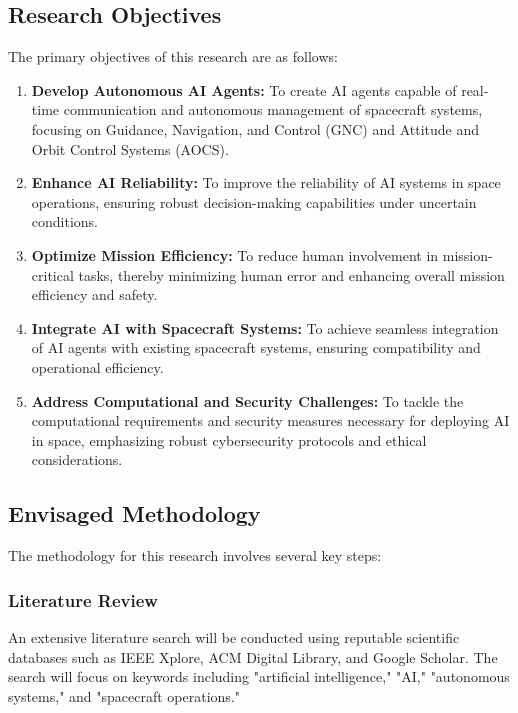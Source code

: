 \documentclass[a4paper,12pt]{article}
\begin{document}
\subsection{Research Objectives}

The primary objectives of this research are as follows:

\begin{enumerate}
    \item \textbf{Develop Autonomous AI Agents:} To create AI agents capable of real-time communication and autonomous management of spacecraft systems, focusing on Guidance, Navigation, and Control (GNC) and Attitude and Orbit Control Systems (AOCS).
    \item \textbf{Enhance AI Reliability:} To improve the reliability of AI systems in space operations, ensuring robust decision-making capabilities under uncertain conditions.
    \item \textbf{Optimize Mission Efficiency:} To reduce human involvement in mission-critical tasks, thereby minimizing human error and enhancing overall mission efficiency and safety.
    \item \textbf{Integrate AI with Spacecraft Systems:} To achieve seamless integration of AI agents with existing spacecraft systems, ensuring compatibility and operational efficiency.
    \item \textbf{Address Computational and Security Challenges:} To tackle the computational requirements and security measures necessary for deploying AI in space, emphasizing robust cybersecurity protocols and ethical considerations.
\end{enumerate}

\subsection{Envisaged Methodology}

The methodology for this research involves several key steps:

\subsubsection{Literature Review}

An extensive literature search will be conducted using reputable scientific databases such as IEEE Xplore, ACM Digital Library, and Google Scholar. The search will focus on keywords including "artificial intelligence," "AI," "autonomous systems," and "spacecraft operations."
\end{document}
